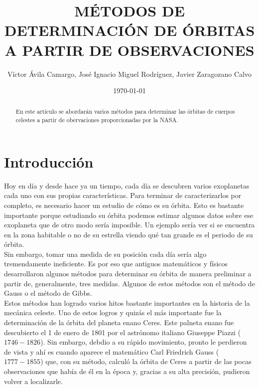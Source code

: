\documentclass{article}
\title{MÉTODOS DE DETERMINACIÓN DE ÓRBITAS A PARTIR DE OBSERVACIONES}   %
\author{
    Víctor Ávila Camargo, José Ignacio Miguel Rodríguez, Javier Zaragozano Calvo
}
\date{\today}  %
\numberwithin{equation}{section}
\begin{document}
\maketitle
\newpage

\tableofcontents

\newpage

\begin{abstract}
    En este artículo se abordarán varios métodos para determinar 
    las órbitas de cuerpos celestes a partir de obervaciones 
    proporcionadas por la NASA.
\end{abstract}
\newpage
\section{Introducción} %
Hoy en día y desde hace ya un tiempo, cada día se descubren 
varios exoplanetas cada uno con sus propias características. 
Para terminar de caracterizarlos por completo, es necesario 
hacer un estudio de cómo es su órbita. Esto es bastante 
importante porque estudiando su órbita podemos estimar algunos 
datos sobre ese exoplaneta que de otro modo sería imposible. 
Un ejemplo sería ver si se encuentra en la zona habitable 
o no de su estrella viendo qué tan grande es el periodo de su 
órbita. \\

Sin embargo, tomar una medida de su posición cada día sería 
algo tremendamente ineficiente. Es por eso que antiguos 
matemáticos y físicos desarrollaron algunos métodos para 
determinar su órbita de manera preliminar a partir de, generalmente, 
tres medidas. Algunos de estos métodos son el método de 
Gauss o el método de Gibbs. \\

Estos métodos han logrado varios hitos bastante importantes 
en la historia de la mecánica celeste. Uno de estos logros 
y quizás el más importante fue la determinación de la órbita 
del planeta enano Ceres. Este palneta enano fue descubierto 
el 1 de enero de 1801 por el astrónomo italiano Giuseppe Piazzi ($1746-1826$). 
Sin embargo, debdio a su rápido movimiento, pronto le perdieron 
de vista y ahí es cuando aparece el matemático Carl Friedrich Gauss ($1777-1855$) 
que, con su método, calculó la órbita de Ceres a partir de 
las pocas observaciones que había de él en la época y, gracias 
a su alta precisión, pudieron volver a localizarle. \\
\end{document}
